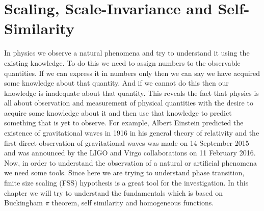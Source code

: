 \ifpdf
\graphicspath{{Chapter2/Figs/}}
\else
\graphicspath{{Chapter2/Figs/}}
\fi

\chapter{Scaling, Scale-Invariance and Self-Similarity}
In physics we observe a natural phenomena and try to understand it using the existing knowledge. To do this we need to assign numbers to the observable quantities. If we can express it in numbers only then we can say we have acquired some knowledge about that quantity. And if we cannot do this then our knowledge is inadequate about that quantity. This reveals the fact that physics is all about observation and measurement of physical quantities with the desire to acquire some knowledge about it and then use that knowledge to predict something that is yet to observe. For example, Albert Einstein predicted the existence of gravitational waves in 1916 in his general theory of relativity and the first direct observation of gravitational waves was made on 14 September 2015 and was announced by the LIGO and Virgo collaborations on 11 February 2016. Now, in order to understand the observation of a natural or artificial phenomena we need some tools. Since here we are trying to understand phase transition, finite size scaling (FSS) hypothesis is a great tool for the investigation. In this chapter we will try to understand the fundamentals which is based on Buckingham $\pi$ theorem, self similarity and homogeneous functions.


